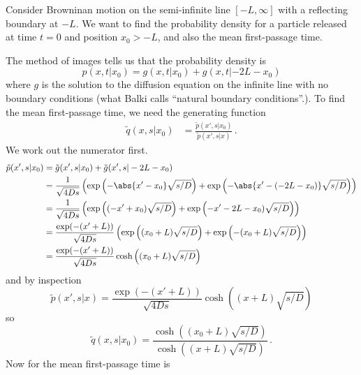 

Consider Browninan motion on the semi-infinite line $[-L , \infty]$ with a reflecting boundary at $-L$.
We want to find the probability density for a particle released at time $t=0$ and position $x_0 > -L$, and also the mean first-passage time.


The method of images tells us that the probability density is
\begin{equation*}
  p(x, t | x_0) = g(x, t | x_0) + g(x, t | -2L - x_0)
\end{equation*}
where $g$ is the solution to the diffusion equation on the infinite line with no boundary conditions (what Balki calls ``natural boundary conditions''.).
To find the mean first-passage time, we need the generating function
\begin{align*}
  \tilde{q}(x, s | x_0)
  &= \frac{\tilde{p}(x', s | x_0)}{\tilde{p}(x', s | x)}
  \, .
\end{align*}
We work out the numerator first.
\begin{align*}
  \tilde{p}(x', s | x_0)
  &= \tilde{g}(x', s | x_0) + \tilde{g}(x', s | -2L - x_0) \\
  &= \frac{1}{\sqrt{4 D s}} \left(
    \exp \left( - \abs{x' - x_0} \sqrt{s / D} \right)
    + \exp \left( - \abs{x' - (-2L - x_0)} \sqrt{s / D} \right)
  \right) \\
  &= \frac{1}{\sqrt{4 D s}} \left(
    \exp \left( (-x' + x_0) \sqrt{s/D} \right)
    + \exp \left( -x' - 2L - x_0 ) \sqrt{s/D} \right)
  \right) \\
  &= \frac{\exp(-(x' + L))}{\sqrt{4 D s}} \left(
    \exp \left( (x_0 + L) \sqrt{s/D} \right)
    + \exp \left( - (x_0 + L) \sqrt{s/D} \right)
  \right) \\
  &= \frac{\exp(-(x' + L))}{\sqrt{4 D s}}
  \cosh \left( (x_0 + L) \sqrt{s/D} \right)
\end{align*}
and by inspection
\begin{equation*}
  \tilde{p} (x', s | x)
  = \frac{\exp(-(x' + L))}{\sqrt{4 D s}}
  \cosh \left( (x + L) \sqrt{s/D} \right)
\end{equation*}
so
\begin{equation*}
  \tilde{q}(x, s | x_0) = \frac{\cosh \left( (x_0 + L) \sqrt{s/D} \right)}{\cosh \left( (x + L) \sqrt{s/D} \right)}
  \, .
\end{equation*}
Now for the mean first-passage time is
